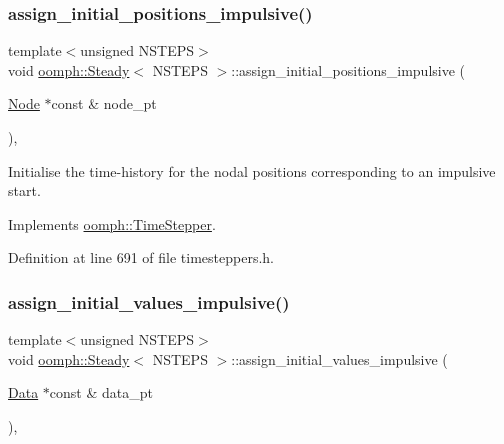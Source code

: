 \subsubsection{\texorpdfstring{assign\+\_\+initial\+\_\+positions\+\_\+impulsive()}{assign\_initial\_positions\_impulsive()}}
{\footnotesize\ttfamily template$<$unsigned N\+S\+T\+E\+PS$>$ \\
void \hyperlink{classoomph_1_1Steady}{oomph\+::\+Steady}$<$ N\+S\+T\+E\+PS $>$\+::assign\+\_\+initial\+\_\+positions\+\_\+impulsive (\begin{DoxyParamCaption}\item[{\hyperlink{classoomph_1_1Node}{Node} $\ast$const \&}]{node\+\_\+pt }\end{DoxyParamCaption})\hspace{0.3cm}{\ttfamily [inline]}, {\ttfamily [virtual]}}



Initialise the time-\/history for the nodal positions corresponding to an impulsive start. 



Implements \hyperlink{classoomph_1_1TimeStepper_ab66972f0eaf3ba34645793e23e46afd5}{oomph\+::\+Time\+Stepper}.



Definition at line 691 of file timesteppers.\+h.

\mbox{\label{classoomph_1_1Steady_a1e25537dc2c134d8d23a9d5c1a1be328}} 
\subsubsection{\texorpdfstring{assign\+\_\+initial\+\_\+values\+\_\+impulsive()}{assign\_initial\_values\_impulsive()}}
{\footnotesize\ttfamily template$<$unsigned N\+S\+T\+E\+PS$>$ \\
void \hyperlink{classoomph_1_1Steady}{oomph\+::\+Steady}$<$ N\+S\+T\+E\+PS $>$\+::assign\+\_\+initial\+\_\+values\+\_\+impulsive (\begin{DoxyParamCaption}\item[{\hyperlink{classoomph_1_1Data}{Data} $\ast$const \&}]{data\+\_\+pt }\end{DoxyParamCaption})\hspace{0.3cm}{\ttfamily [inline]}, {\ttfamily [virtual]}}



